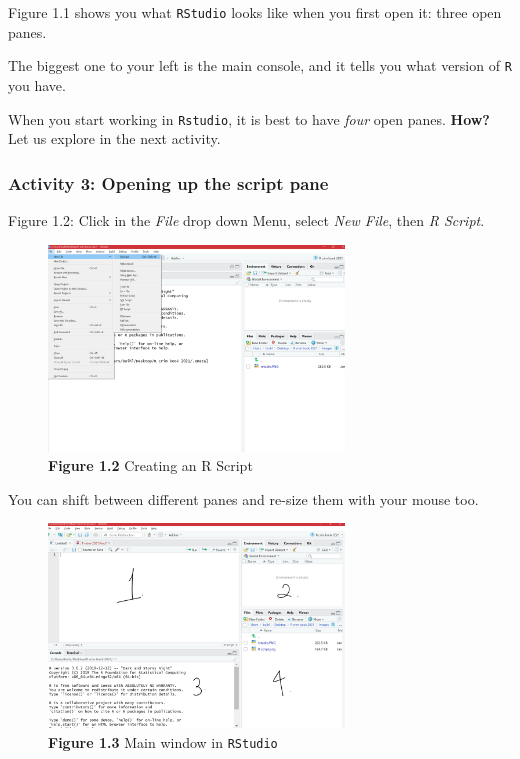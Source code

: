 \documentclass[
]{book}
\begin{document}
Figure 1.1 shows you what \texttt{RStudio} looks like when you first open it: three open panes.

The biggest one to your left is the main console, and it tells you what version of \texttt{R} you have.

When you start working in \texttt{Rstudio}, it is best to have \emph{four} open panes. \textbf{How?} Let us explore in the next activity.

\hypertarget{activity-3-opening-up-the-script-pane}{%
\subsubsection{Activity 3: Opening up the script pane}\label{activity-3-opening-up-the-script-pane}}

Figure 1.2: Click in the \emph{File} drop down Menu, select \emph{New File}, then \emph{R Script}.

\begin{figure}
\centering
\includegraphics[width=0.7\textwidth,height=\textheight]{Images/R script.png}
\caption{\textbf{Figure 1.2} Creating an R Script}
\end{figure}

You can shift between different panes and re-size them with your mouse too.

\begin{figure}
\centering
\includegraphics[width=0.7\textwidth,height=\textheight]{Images/main window.png}
\caption{\textbf{Figure 1.3} Main window in \texttt{RStudio}}
\end{figure}
\end{document}
